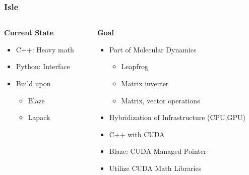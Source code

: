 \documentclass{beamer}
\begin{document}
\begin{frame}\frametitle{Isle}

    \begin{columns}
    \begin{column}[t]{0.5\textwidth}
        \centering
        \textbf{Current State}
        \begin{itemize}
            \item C++: Heavy math
            \item Python: Interface
            \item Build upon
            \begin{itemize}
                \item Blaze
                \item Lapack
            \end{itemize}
        \end{itemize}
    \end{column}
    \begin{column}[t]{0.5\textwidth}
        \centering
        \textbf{Goal}
        \begin{itemize}
            \item Port of Molecular Dynamics
            \begin{itemize}
                \item Leapfrog
                \item Matrix inverter
                \item Matrix, vector operations
            \end{itemize}
            \item Hybridization of Infrastructure (CPU,GPU)
            \item C++ with CUDA
            \item Blaze: CUDA Managed Pointer
            \item Utilize CUDA Math Libraries
        \end{itemize}
    \end{column}
    \end{columns}
\end{frame}
\end{document}
